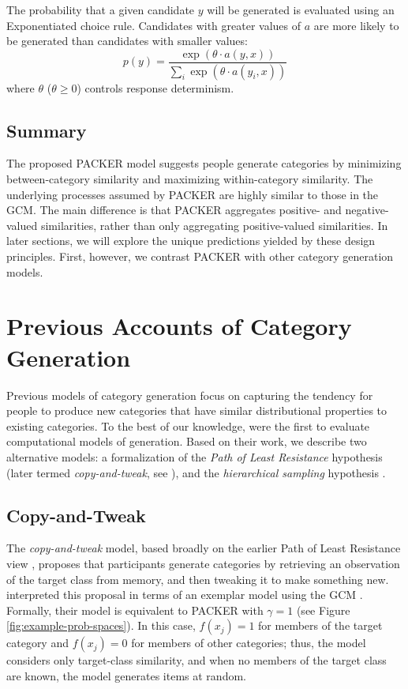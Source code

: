 \documentclass[10pt,letterpaper]{article}
\begin{document}
The probability that a given candidate $y$ will be generated is evaluated using an Exponentiated \citet{luce1977choice} choice rule. Candidates with greater values of $a$ are more likely to be generated than candidates with smaller values:
\begin{equation}
p(y) = \dfrac
    { \exp( { \theta \cdot a(y, x) } ) }
    { \sum_i{ \exp( { \theta \cdot a(y_i, x) } ) } }
    \label{eq:packer-choice}
\end{equation}
where $\theta$ ($\theta \geq 0$) controls response determinism. 

\subsection{Summary}
The proposed PACKER model suggests people generate categories by minimizing between-category similarity and maximizing within-category similarity. The underlying processes assumed by PACKER are highly similar to those in the GCM. The main difference is that PACKER aggregates positive- and negative-valued similarities, rather than only aggregating positive-valued similarities. In later sections, we will explore the unique predictions yielded by these design principles. First, however, we contrast PACKER with other category generation models. 

\section{Previous Accounts of Category Generation}

Previous models of category generation focus on capturing the tendency for people to produce new categories that have similar distributional properties to existing categories. To the best of our knowledge, \citet{jern2013probabilistic} were the first to evaluate computational models of generation. Based on their work, we describe two alternative models: a formalization of the \textit{Path of Least Resistance} hypothesis (later termed {\em copy-and-tweak}, see \citealp{jern2013probabilistic}), and the \textit{hierarchical sampling} hypothesis \citep{jern2013probabilistic}.


\subsection{Copy-and-Tweak}
The \textit{copy-and-tweak} model, based broadly on the earlier Path of Least Resistance view \citep{ward1994structured,ward1995s}, proposes that participants generate categories by retrieving an observation of the target class from memory, and then tweaking it to make something new. \citet{jern2013probabilistic} interpreted this proposal in terms of an exemplar model using the GCM \citep{nosofsky1984choice}. Formally, their model is equivalent to PACKER with $\gamma = 1$ (see Figure \ref{fig:example-prob-spaces}). In this case,  $f(x_j) = 1$ for members of the target category and $f(x_j) = 0$ for members of other categories; thus, the model considers only target-class similarity, and when no members of the target class are known, the model generates items at random. 
\end{document}

